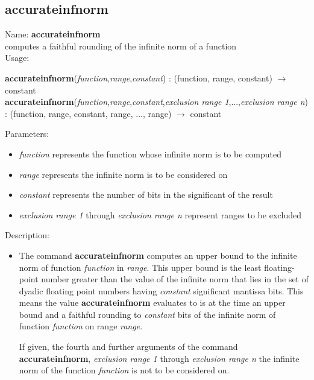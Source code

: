 \subsection{accurateinfnorm}
\label{labaccurateinfnorm}
\noindent Name: \textbf{accurateinfnorm}\\
computes a faithful rounding of the infinite norm of a function \\

\noindent Usage: 
\begin{center}
\textbf{accurateinfnorm}(\emph{function},\emph{range},\emph{constant}) : (\textsf{function}, \textsf{range}, \textsf{constant}) $\rightarrow$ \textsf{constant}\\
\textbf{accurateinfnorm}(\emph{function},\emph{range},\emph{constant},\emph{exclusion range 1},...,\emph{exclusion range n}) : (\textsf{function}, \textsf{range}, \textsf{constant}, \textsf{range}, ..., \textsf{range}) $\rightarrow$ \textsf{constant}\\
\end{center}
Parameters: 
\begin{itemize}
\item \emph{function} represents the function whose infinite norm is to be computed
\item \emph{range} represents the infinite norm is to be considered on
\item \emph{constant} represents the number of bits in the significant of the result
\item \emph{exclusion range 1} through \emph{exclusion range n} represent ranges to be excluded 
\end{itemize}
\noindent Description: \begin{itemize}

\item The command \textbf{accurateinfnorm} computes an upper bound to the infinite norm of
   function \emph{function} in \emph{range}. This upper bound is the least
   floating-point number greater than the value of the infinite norm that
   lies in the set of dyadic floating point numbers having \emph{constant}
   significant mantissa bits. This means the value \textbf{accurateinfnorm} evaluates to
   is at the time an upper bound and a faithful rounding to \emph{constant}
   bits of the infinite norm of function \emph{function} on range \emph{range}.
    
   If given, the fourth and further arguments of the command \textbf{accurateinfnorm},
   \emph{exclusion range 1} through \emph{exclusion range n} the infinite norm of
   the function \emph{function} is not to be considered on.
\end{itemize}
